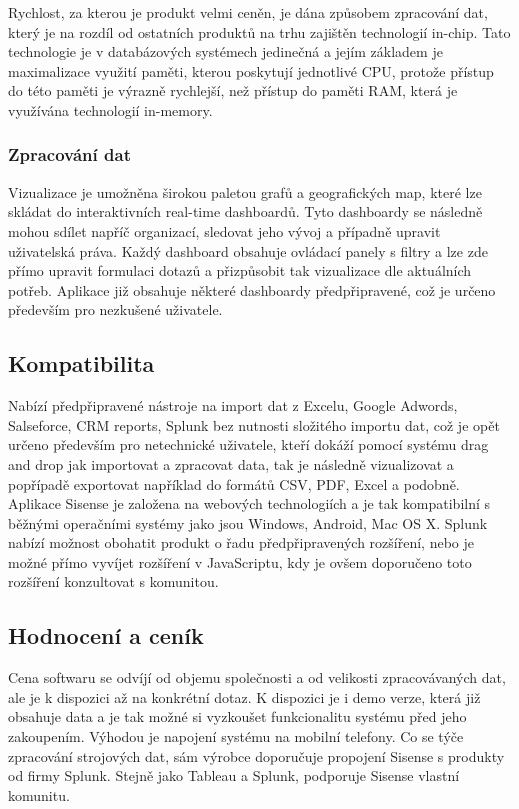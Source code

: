 \documentclass[czech,BP]{thesiskiv}
\begin{document}
  
  Rychlost, za kterou je produkt velmi ceněn, je dána způsobem zpracování dat, který je na rozdíl od ostatních produktů na trhu zajištěn technologií in-chip. Tato technologie je v databázových systémech jedinečná a jejím základem je maximalizace využití paměti, kterou poskytují jednotlivé CPU, protože přístup do této paměti je výrazně rychlejší, než přístup do paměti RAM, která je využívána technologií in-memory.
 \subsubsection{Zpracování dat}
 Vizualizace je umožněna širokou paletou grafů a geografických map, které lze skládat do interaktivních real-time dashboardů. Tyto dashboardy se následně mohou sdílet napříč organizací, sledovat jeho vývoj a případně upravit uživatelská práva. Každý dashboard obsahuje ovládací panely s filtry a lze zde přímo upravit formulaci dotazů a přizpůsobit tak vizualizace dle aktuálních potřeb. Aplikace již obsahuje některé dashboardy předpřipravené, což je určeno především pro nezkušené uživatele.\cite{SisenseVizualize}
 		
 
 \subsection{Kompatibilita}
  Nabízí předpřipravené nástroje na import dat z Excelu, Google Adwords, Salseforce, CRM reports, Splunk bez nutnosti složitého importu dat, což je opět určeno především pro netechnické uživatele, kteří dokáží pomocí systému drag and drop jak importovat a zpracovat data, tak je následně vizualizovat a popřípadě exportovat například do formátů CSV, PDF, Excel a podobně. \cite{PDF} Aplikace Sisense je založena na webových technologiích a je tak kompatibilní s běžnými operačními systémy jako jsou Windows, Android, Mac OS X. Splunk nabízí možnost obohatit produkt o řadu předpřipravených rozšíření, nebo je možné  přímo vyvíjet rozšíření v JavaScriptu, kdy je ovšem doporučeno toto rozšíření konzultovat s komunitou.\cite{SisenseAdd-ons}
 
 \subsection{Hodnocení a ceník}
 Cena softwaru se odvíjí od objemu společnosti a od velikosti zpracovávaných dat, ale je k dispozici až na konkrétní dotaz. K dispozici je i demo verze, která již obsahuje data a je tak možné si vyzkoušet funkcionalitu systému před jeho zakoupením. Výhodou je napojení systému na mobilní telefony. Co se týče zpracování strojových dat, sám výrobce doporučuje propojení Sisense s produkty od firmy Splunk. Stejně jako Tableau a Splunk, podporuje Sisense vlastní komunitu.\cite{SisenseAndSplunk}
 
\end{document}
